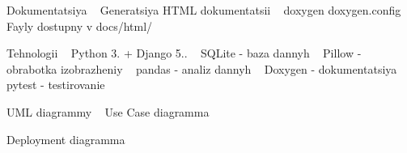 Dokumentatsiya ~\newline
 Generatsiya HTML dokumentatsii ~\newline
 doxygen doxygen.\+config ~\newline
 Fayly dostupny v docs/html/ ~\newline


Tehnologii ~\newline
 Python 3. + Django 5.. ~\newline
 SQLite -\/ baza dannyh ~\newline
 Pillow -\/ obrabotka izobrazheniy ~\newline
 pandas -\/ analiz dannyh ~\newline
 Doxygen -\/ dokumentatsiya ~\newline
 pytest -\/ testirovanie ~\newline


UML diagrammy ~\newline
 Use Case diagramma ~\newline
  ~\newline


Deployment diagramma ~\newline
  ~\newline
 